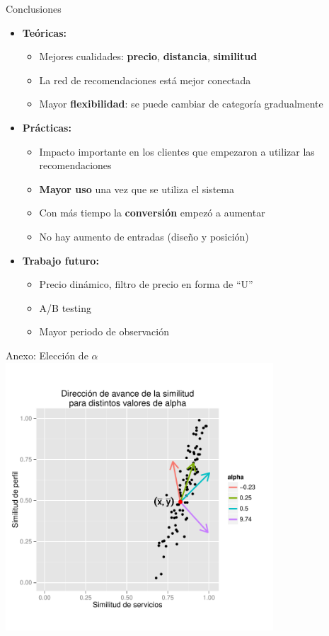 \documentclass{beamer}
\begin{document}
\begin{frame}{Conclusiones}
	\begin{itemize}
		\item \textbf{Teóricas:}
		\begin{itemize}
			\item Mejores cualidades: \textbf{precio}, \textbf{distancia}, \textbf{similitud}
			\item La red de recomendaciones está mejor conectada
			\item Mayor \textbf{flexibilidad}: se puede cambiar de categoría gradualmente
		\end{itemize}
		\item \textbf{Prácticas:}
		\begin{itemize}
			\item Impacto importante en los clientes que empezaron a utilizar las recomendaciones
			\item \textbf{Mayor uso} una vez que se utiliza el sistema
			\item Con más tiempo la \textbf{conversión} empezó a aumentar
			\item No hay aumento de entradas (diseño y posición)
		\end{itemize}
		\item \textbf{Trabajo futuro:}
		\begin{itemize}
			\item Precio dinámico, filtro de precio en forma de ``U''
			\item A/B testing
			\item Mayor periodo de observación
		\end{itemize}
	\end{itemize}
\end{frame}

\begin{frame}{Anexo: Elección de $\alpha$}
	\centering
	\includegraphics[width=0.75\textwidth]{imagenes/alpha.pdf}
\end{frame}
\end{document}
